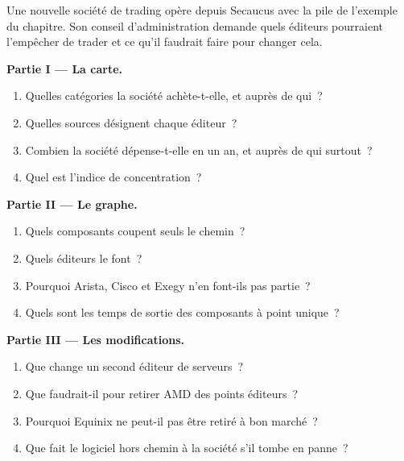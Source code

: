 \begin{problem}\label{pb:nw:the-vendor-map:1}
Une nouvelle société de trading opère depuis Secaucus avec la pile de l'exemple du chapitre. Son conseil d'administration demande quels éditeurs pourraient l'empêcher de trader et ce qu'il faudrait
faire pour changer cela.

\medskip\noindent\textbf{Partie I --- La carte.}
\begin{enumerate}
\item Quelles catégories la société achète-t-elle, et auprès de qui~?
\item Quelles sources désignent chaque éditeur~?
\item Combien la société dépense-t-elle en un an, et auprès de qui surtout~?
\item Quel est l'indice de concentration~?
\end{enumerate}

\medskip\noindent\textbf{Partie II --- Le graphe.}
\begin{enumerate}[resume]
\item Quels composants coupent seuls le chemin~?
\item Quels éditeurs le font~?
\item Pourquoi Arista, Cisco et Exegy n'en font-ils pas partie~?
\item Quels sont les temps de sortie des composants à point unique~?
\end{enumerate}

\medskip\noindent\textbf{Partie III --- Les modifications.}
\begin{enumerate}[resume]
\item Que change un second éditeur de serveurs~?
\item Que faudrait-il pour retirer AMD des points éditeurs~?
\item Pourquoi Equinix ne peut-il pas être retiré à bon marché~?
\item Que fait le logiciel hors chemin à la société s'il tombe en panne~?
\end{enumerate}


\end{problem}
